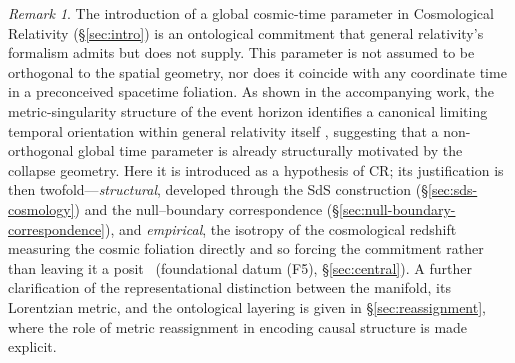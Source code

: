 \documentclass[11pt,a4paper]{article}
\theoremstyle{plain}
\theoremstyle{definition}
\theoremstyle{remark}
\newtheorem{remark}{Remark}
\begin{document}
\begin{remark} The introduction of a global cosmic-time parameter in Cosmological Relativity (\S\ref{sec:intro}) is an ontological commitment that general relativity's formalism admits but does not supply. This parameter is not assumed to be orthogonal to the spatial geometry, nor does it coincide with any coordinate time in a preconceived spacetime foliation. As shown in the accompanying work, the metric-singularity structure of the event horizon identifies a canonical limiting temporal orientation within general relativity itself \cite{JanzenBHcausality}, suggesting that a non-orthogonal global time parameter is already structurally motivated by the collapse geometry. Here it is introduced as a hypothesis of CR; its justification is then twofold---\emph{structural}, developed through the SdS construction (\S\ref{sec:sds-cosmology}) and the null--boundary correspondence (\S\ref{sec:null-boundary-correspondence}), and \emph{empirical}, the isotropy of the cosmological redshift measuring the cosmic foliation directly and so forcing the commitment rather than leaving it a posit~\cite{JanzenModernParallax} (foundational datum (F5), \S\ref{sec:central}). A further clarification of the representational distinction between the manifold, its Lorentzian metric, and the ontological layering is given in \S\ref{sec:reassignment}, where the role of metric reassignment in encoding causal structure is made explicit.
\end{remark}
\end{document}
